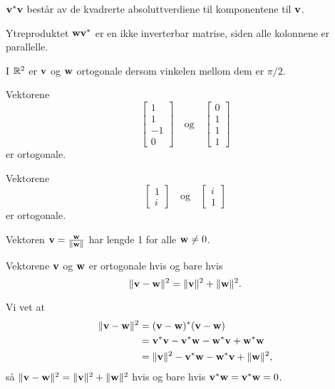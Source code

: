  
\begin{merkx}
$\mathbf{v}^*\mathbf{v}$ består av de kvadrerte absoluttverdiene til komponentene til $\mathbf{v}$. 
\end{merkx}
 
 \begin{merkx}
 Ytreproduktet $ \mathbf{w} \mathbf{v}^*$ er en ikke inverterbar matrise, siden alle kolonnene er parallelle.
 \end{merkx}
 
 

 \begin{ex}
I $\mathbb{R}^2$ er $\mathbf{v}$ og $\mathbf{w}$ ortogonale dersom vinkelen mellom dem er $\pi/2$.
\end{ex}


 \begin{ex}
 Vektorene 
 \[
 \begin{bmatrix}
 1 \\ 
 1 \\
 -1\\
 0
 \end{bmatrix}
 \quad
 \text{og}
 \quad
  \begin{bmatrix}
 0 \\ 
 1 \\
 1\\
 1
 \end{bmatrix}
\]
er ortogonale. 
 \end{ex}

 \begin{ex}
 Vektorene 
 \[
 \begin{bmatrix}
 1 \\ 
 i 
 \end{bmatrix}
 \quad
 \text{og}
 \quad
  \begin{bmatrix}
 i \\ 
1
 \end{bmatrix}
\]
er ortogonale. 
 \end{ex}


 \begin{ex}
 Vektoren $\mathbf{v}=\frac{\mathbf{w}}{\|\mathbf{w}\|}$ har lengde 1 for alle $\mathbf{w} \neq 0$.
 \end{ex}

\begin{thm}
Vektorene $\mathbf{v}$ og $\mathbf{w}$ er ortogonale hvis og bare hvis
\[
\|\mathbf{v}-\mathbf{w}\|^2=\|\mathbf{v}\|^2+\|\mathbf{w}\|^2.
\]
\end{thm}

\noindent Vi vet at 
\begin{align*}
\|\mathbf{v}-\mathbf{w} \|^2&=(\mathbf{v}-\mathbf{w})^*(\mathbf{v}-\mathbf{w})\\&=\mathbf{v}^*\mathbf{v}-\mathbf{v}^*\mathbf{w}-\mathbf{w}^*\mathbf{v}+\mathbf{w}^*\mathbf{w}\\ & =\|\mathbf{v}\|^2 -\mathbf{v}^*\mathbf{w}-\mathbf{w}^*\mathbf{v}+\|\mathbf{w}\|^2,
\end{align*}
så $\|\mathbf{v}-\mathbf{w}\|^2=\|\mathbf{v}\|^2+\|\mathbf{w}\|^2$ hvis og bare hvis $\mathbf{v}^* \mathbf{w}=\mathbf{v}^* \mathbf{w}=0$.

